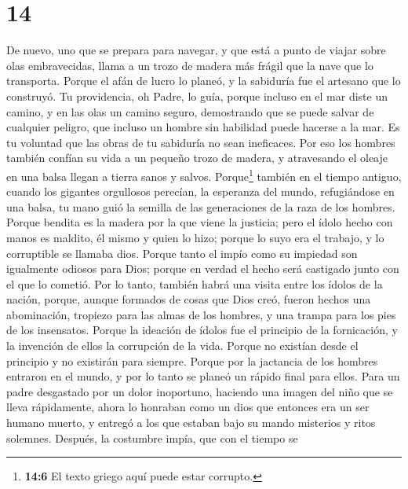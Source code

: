 \hypertarget{section-13}{%
\section{14}\label{section-13}}

 De nuevo, uno que se prepara para navegar, y que está a
punto de viajar sobre olas embravecidas, llama a un trozo de madera más
frágil que la nave que lo transporta.  Porque el afán de
lucro lo planeó, y la sabiduría fue el artesano que lo construyó.
 Tu providencia, oh Padre, lo guía, porque incluso en el
mar diste un camino, y en las olas un camino seguro, 
demostrando que se puede salvar de cualquier peligro, que incluso un
hombre sin habilidad puede hacerse a la mar.  Es tu
voluntad que las obras de tu sabiduría no sean ineficaces. Por eso los
hombres también confían su vida a un pequeño trozo de madera, y
atravesando el oleaje en una balsa llegan a tierra sanos y salvos.
 Porque\footnote{\textbf{14:6} El texto griego aquí puede
  estar corrupto.} también en el tiempo antiguo, cuando los gigantes
orgullosos perecían, la esperanza del mundo, refugiándose en una balsa,
tu mano guió la semilla de las generaciones de la raza de los hombres.
 Porque bendita es la madera por la que viene la justicia;
 pero el ídolo hecho con manos es maldito, él mismo y
quien lo hizo; porque lo suyo era el trabajo, y lo corruptible se
llamaba dios.  Porque tanto el impío como su impiedad son
igualmente odiosos para Dios;  porque en verdad el hecho
será castigado junto con el que lo cometió.  Por lo
tanto, también habrá una visita entre los ídolos de la nación, porque,
aunque formados de cosas que Dios creó, fueron hechos una abominación,
tropiezo para las almas de los hombres, y una trampa para los pies de
los insensatos.  Porque la ideación de ídolos fue el
principio de la fornicación, y la invención de ellos la corrupción de la
vida.  Porque no existían desde el principio y no
existirán para siempre.  Porque por la jactancia de los
hombres entraron en el mundo, y por lo tanto se planeó un rápido final
para ellos.  Para un padre desgastado por un dolor
inoportuno, haciendo una imagen del niño que se lleva rápidamente, ahora
lo honraban como un dios que entonces era un ser humano muerto, y
entregó a los que estaban bajo su mando misterios y ritos solemnes.
 Después, la costumbre impía, que con el tiempo se
